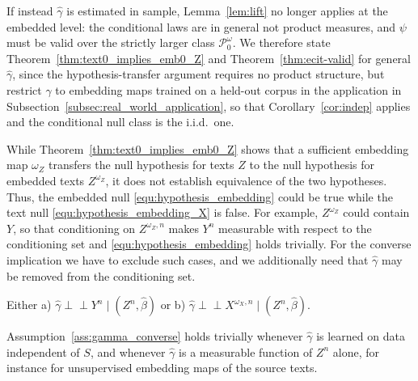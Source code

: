 \documentclass[twoside,11pt]{article}
\newcommand{\indep}{\perp \!\!\! \perp}
\begin{document}
If instead $\hat\gamma$ is estimated in sample, Lemma~\ref{lem:lift} no longer applies at the embedded level: the conditional laws are in general not product measures, and $\psi$ must be valid over the strictly larger class $\mathcal{P}_0^{\omega}$. 
We therefore state Theorem~\ref{thm:text0_implies_emb0_Z} and Theorem~\ref{thm:ecit-valid} for general $\hat\gamma$, since the hypothesis-transfer argument requires no product structure, but restrict $\hat\gamma$ to embedding maps trained on a held-out corpus in the application in Subsection~\ref{subsec:real_world_application}, so that Corollary~\ref{cor:indep} applies and the conditional null class is the i.i.d.\ one.

While Theorem~\ref{thm:text0_implies_emb0_Z} shows that a sufficient embedding map $\omega_Z$ transfers the null hypothesis for texts $Z$ to the null hypothesis for embedded texts $Z^{\omega_Z}$, it does not establish equivalence of the two hypotheses. Thus, the embedded null \eqref{equ:hypothesis_embedding} could be true while the text null \eqref{equ:hypothesis_embedding_X} is false. For example, $Z^{\omega_Z}$ could contain $Y$, so that conditioning on $Z^{\omega_Z,n}$ makes $Y^n$ measurable with respect to the conditioning set and \eqref{equ:hypothesis_embedding} holds trivially. For the converse implication we have to exclude such cases, and we additionally need that $\hat\gamma$ may be removed from the conditioning set. 

\begin{assumption}\label{ass:gamma_converse}
Either a) $\hat\gamma\indep Y^n\mid (Z^n,\hat\beta)$ or
b) $\hat\gamma\indep X^{\omega_X,n}\mid (Z^n,\hat\beta)$.
\end{assumption}

Assumption~\ref{ass:gamma_converse} holds trivially whenever $\hat\gamma$ is learned on data independent of $S$, and whenever $\hat\gamma$ is a measurable function of $Z^n$ alone, for instance for unsupervised embedding maps of the source texts. %
\end{document}
